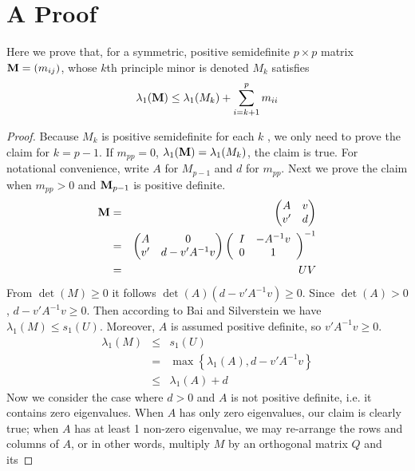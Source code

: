 \documentclass{article}
\begin{document}
\section{A Proof}
Here we prove that, for a symmetric, positive semidefinite $p \times
p$ matrix $\mathbf{M} = (m_{ij})$, whose $k$th principle minor is denoted
$M_k$ satisfies
\[
\lambda_1(\mathbf{M}) \leq \lambda_1(M_{k}) + \sum_{i=k+1}^p m_{ii}
\]
\begin{proof}
  Because $M_k$ is positive semidefinite for each $k$ , we only need
  to prove the claim for $k=p-1$. If $m_{pp} = 0$, $\lambda_1(\mathbf{M}) =
  \lambda_1(M_{k})$, the claim is true. For notational convenience,
  write $A$ for $M_{p-1}$ and $d$ for $m_{pp}$. Next we prove the
  claim when $m_{pp} > 0$ and $\mathbf{M}_{p-1}$ is positive definite. 
  \begin{eqnarray*}
    \mathbf{M} &=&
    \begin{pmatrix}
      A & v \\
      v' & d
    \end{pmatrix} \\
    &=&
    \begin{pmatrix}
      A & 0 \\
      v' & d - v' A^{-1} v
    \end{pmatrix}\left(
      \begin{array}{cc}
        I & -A^{-1} v \\
        0 & 1
      \end{array}\right)^{-1} \\
    &=& U V
  \end{eqnarray*}
  From $\det(M) \geq 0$ it follows $\det(A) (d - v' A^{-1} v) \geq
  0$. Since $\det(A) > 0$, $d - v' A^{-1} v \geq 0$. Then according to
  Bai and Silverstein\cite{BaiSilverstein2010} we have $\lambda_1(M)
  \leq s_1(U)$. Moreover, $A$ is assumed positive definite, so $v'
  A^{-1} v \geq 0$.
  \begin{eqnarray*}
    \lambda_1(M) &\leq& s_1(U) \\
    &=& \max\left\{\lambda_1(A), d - v' A^{-1} v \right\} \\
    &\leq& \lambda_1(A) + d
  \end{eqnarray*}
  Now we consider the case where $ d > 0$ and $A$ is not positive
  definite, i.e. it contains zero eigenvalues. When $A$ has only zero
  eigenvalues, our claim is clearly true; when $A$ has at least 1
  non-zero eigenvalue, we may re-arrange the rows and columns of $A$,
  or in other words, multiply $M$ by an orthogonal matrix $Q$ and its

\end{proof}
\end{document}
